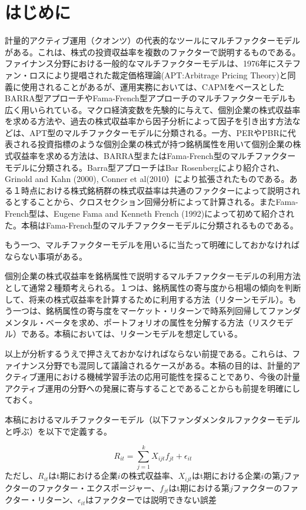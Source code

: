 \section{はじめに} %
計量的アクティブ運用（クオンツ）の代表的なツールにマルチファクターモデルがある。これは、株式の投資収益率を複数のファクターで説明するものである。ファイナンス分野における一般的なマルチファクターモデルは、1976年にステファン・ロスにより提唱された裁定価格理論(APT:Arbitrage Pricing Theory)と同義に使用されることがあるが、運用実務においては、CAPMをベースとしたBARRA型アプローチやFama-French型アプローチのマルチファクターモデルも広く用いられている。マクロ経済変数を先験的に与えて、個別企業の株式収益率を求める方法や、過去の株式収益率から因子分析によって因子を引き出す方法などは、APT型のマルチファクターモデルに分類される。一方、PERやPBRに代表される投資指標のような個別企業の株式が持つ銘柄属性を用いて個別企業の株式収益率を求める方法は、BARRA型またはFama-French型のマルチファクターモデルに分類される。Barra型アプローチはBar Rosenbergにより紹介され、Grinold and Kahn (2000), Conner et al(2010）により拡張されたものである。ある１時点における株式銘柄群の株式収益率は共通のファクターによって説明されるとすることから、クロスセクション回帰分析によって計算される。またFama-French型は、Eugene Fama and Kenneth French (1992)によって初めて紹介された。本稿はFama-French型のマルチファクターモデルに分類されるものである。

もう一つ、マルチファクターモデルを用いるに当たって明確にしておかなければならない事項がある。

個別企業の株式収益率を銘柄属性で説明するマルチファクターモデルの利用方法として通常２種類考えられる。１つは、銘柄属性の寄与度から相場の傾向を判断して、将来の株式収益率を計算するために利用する方法（リターンモデル）。もう一つは、銘柄属性の寄与度をマーケット・リターンで時系列回帰してファンダメンタル・ベータを求め、ポートフォリオの属性を分解する方法（リスクモデル）である。本稿においては、リターンモデルを想定している。

以上が分析するうえで押さえておかなければならない前提である。これらは、ファイナンス分野でも混同して議論されるケースがある。本稿の目的は、計量的アクティブ運用における機械学習手法の応用可能性を探ることであり、今後の計量アクティブ運用の分野への発展に寄与することであることからも前提を明確にしておく。


本稿におけるマルチファクターモデル（以下ファンダメンタルファクターモデルと呼ぶ）を以下で定義する。

\begin{equation}
R_{it}=\sum^{k}_{j=1}X_{ijt}f_{jt} + \epsilon_{it}
\end{equation}
ただし、$R_{it}$はt期における企業$i$の株式収益率、$X_{ijt}$はt期における企業$i$の第$j$ファクターのファクター・エクスポージャー、$f_{jt}$はt期における第$j$ファクターのファクター・リターン、$\epsilon_{it}$はファクターでは説明できない誤差


